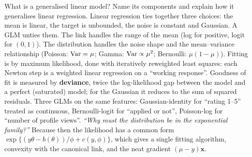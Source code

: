 \begin{qa}{ What is a generalised linear model? Name its
components and explain how it generalises linear regression.}
\why
Linear regression ties together three choices: the mean is linear, the target is unbounded, the noise is constant and
Gaussian. A GLM unties them. The link handles the range of the mean (log for positive, logit for $(0,1)$). The
distribution handles the noise shape and the mean--variance relationship (Poisson: $\operatorname{Var} = \mu$; Gamma: $\operatorname{Var} \propto
\mu^2$; Bernoulli: $\mu(1-\mu)$). Fitting is by maximum likelihood, done with iteratively reweighted least squares:
each Newton step is a weighted linear regression on a ``working response''. Goodness of fit is measured by
\textbf{deviance}, twice the log-likelihood gap between the model and a perfect (saturated) model; for the Gaussian it
reduces to the sum of squared residuals.
\worked Three GLMs on the same features: Gaussian-identity for ``rating 1--5'' treated as continuous,
Bernoulli-logit for ``applied or not'', Poisson-log for ``number of profile views''.
\pushes \emph{``Why must the distribution be in the exponential family?''} Because then the likelihood has a common form
$\exp\{(y\theta - b(\theta))/\phi + c(y,\phi)\}$, which gives a single fitting algorithm, convexity with the canonical
link, and the neat gradient $(\mu - y)\mathbf x$.
\end{qa}

